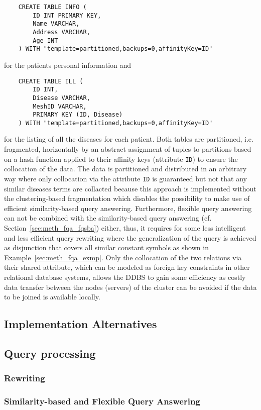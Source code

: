 \begin{verbatim}
    CREATE TABLE INFO (
        ID INT PRIMARY KEY,
        Name VARCHAR,
        Address VARCHAR,
        Age INT
    ) WITH "template=partitioned,backups=0,affinityKey=ID"
\end{verbatim}
for the patients personal information and
\begin{verbatim}
    CREATE TABLE ILL (
        ID INT,
        Disease VARCHAR,
        MeshID VARCHAR,
        PRIMARY KEY (ID, Disease)
    ) WITH "template=partitioned,backups=0,affinityKey=ID"
\end{verbatim}
for the listing of all the diseases for each patient. Both tables are partitioned, i.e. fragmented, horizontally by an abstract assignment of tuples to
partitions based on a hash function applied to their affinity keys (attribute \verb!ID!) to ensure the collocation of the data. The data is partitioned and 
distributed in an arbitrary way where only collocation via the attribute \verb!ID! is guaranteed but not that any similar diseases terms are collacted because
this approach is implemented without the clustering-based fragmentation which disables the possibility to make use of efficient similarity-based query
answering. Furthermore, flexible query answering can not be combined with the similarity-based query answering (cf. Section~\ref{sec:meth_fqa_fqsba}) either,
thus, it requires for some less intelligent and less efficient query rewriting where the generalization of the query is achieved as disjunction that covers all
similar constant symbols as shown in Example~\ref{sec:meth_fqa_exmp}. Only the collocation of the two relations via their shared attribute, which can be 
modeled as foreign key constraints in other relational database systems, allows the DDBS to gain some efficiency as costly data transfer between the nodes
(servers) of the cluster can be avoided if the data to be joined is available locally.

\subsection{Implementation Alternatives}
\label{sec:impl_alter}




\subsection{Query processing}
\label{sec:impl_qpro}

\subsubsection{Rewriting}

\subsubsection{Similarity-based and Flexible Query Answering}